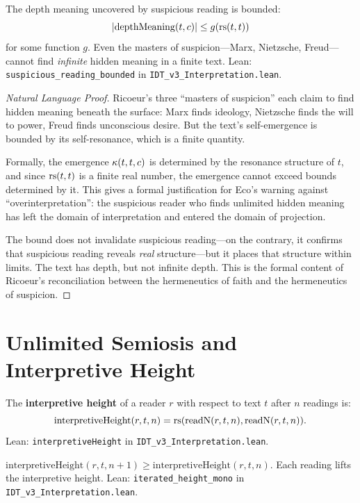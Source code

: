 \begin{theorem}
\label{thm:suspicious-bounded}
The depth meaning uncovered by suspicious reading is bounded:
\[
|\mathrm{depthMeaning}(t, c)| \leq g(\mathrm{rs}(t, t))
\]
for some function $g$.  Even the masters of suspicion---Marx, Nietzsche,
Freud---cannot find \emph{infinite} hidden meaning in a finite text.
Lean: \texttt{suspicious\_reading\_bounded} in \texttt{IDT\_v3\_Interpretation.lean}.
\end{theorem}

\begin{proof}[Natural Language Proof]
Ricoeur's three ``masters of suspicion'' each claim to find hidden meaning
beneath the surface: Marx finds ideology, Nietzsche finds the will to power,
Freud finds unconscious desire.  But the text's self-emergence is bounded by
its self-resonance, which is a finite quantity.

Formally, the emergence $\kappa(t, t, c)$ is determined by the resonance
structure of $t$, and since $\mathrm{rs}(t, t)$ is a finite real number, the emergence
cannot exceed bounds determined by it.  This gives a formal justification for
Eco's warning against ``overinterpretation'': the suspicious reader who finds
unlimited hidden meaning has left the domain of interpretation and entered
the domain of projection.

The bound does not invalidate suspicious reading---on the contrary, it
confirms that suspicious reading reveals \emph{real} structure---but it
places that structure within limits.  The text has depth, but not infinite
depth.  This is the formal content of Ricoeur's reconciliation between
the hermeneutics of faith and the hermeneutics of suspicion.
\end{proof}

\section{Unlimited Semiosis and Interpretive Height}

\begin{definition}
\label{def:interpretive-height}
The \textbf{interpretive height} of a reader $r$ with respect to text $t$
after $n$ readings is:
\[
\mathrm{interpretiveHeight}(r, t, n) = \mathrm{rs}(\mathrm{readN}(r, t, n), \mathrm{readN}(r, t, n)).
\]
Lean: \texttt{interpretiveHeight} in \texttt{IDT\_v3\_Interpretation.lean}.
\end{definition}

\begin{theorem}
\label{thm:height-monotone}
$\mathrm{interpretiveHeight}(r, t, n+1) \geq \mathrm{interpretiveHeight}(r, t, n)$.
Each reading lifts the interpretive height.
Lean: \texttt{iterated\_height\_mono} in \texttt{IDT\_v3\_Interpretation.lean}.
\end{theorem}

